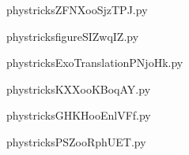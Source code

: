     \newcommand{\CaptionFigZFNXooSjzTPJ}{<+Type your caption here+>}
    \begin{center}
        
    \end{center}
    phystricksZFNXooSjzTPJ.py

    

    \clearpage
    


    \newcommand{\CaptionFigfigureSIZwqIZ}{<+Type your caption here+>}
    \begin{center}
        
    \end{center}
    phystricksfigureSIZwqIZ.py

    

    \clearpage
    


    \newcommand{\CaptionFigExoTranslationPNjoHk}{<+Type your caption here+>}
    \begin{center}
        
    \end{center}
    phystricksExoTranslationPNjoHk.py

    

    \clearpage
    


    \newcommand{\CaptionFigKXXooKBoqAY}{<+Type your caption here+>}
    \begin{center}
        
    \end{center}
    phystricksKXXooKBoqAY.py

    

    \clearpage
    


    \newcommand{\CaptionFigGHKHooEnlVFf}{<+Type your caption here+>}
    \begin{center}
        
    \end{center}
    phystricksGHKHooEnlVFf.py

    

    \clearpage
    


    \newcommand{\CaptionFigPSZooRphUET}{<+Type your caption here+>}
    \begin{center}
        
    \end{center}
    phystricksPSZooRphUET.py

